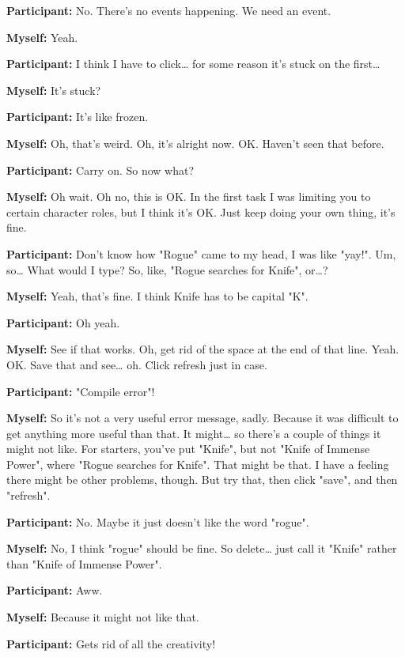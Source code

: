 \documentclass[11pt]{report}
\newcommand{\llabel}[1]{\hypertarget{llineno:#1}{\linelabel{#1}}}
\begin{document}
\begin{linenumbers}
\textbf{Participant:} No. There's no events happening. We need an event.

\textbf{Myself:} Yeah.

\textbf{Participant:} I think I have to click\ldots{} for some reason it's stuck on the first\ldots{}

\textbf{Myself:} It's stuck?

\textbf{Participant:} It's like frozen.

\textbf{Myself:} Oh, that's weird. Oh, it's alright now. OK. Haven't seen that before.

\textbf{Participant:} Carry on. So now what?

\textbf{Myself:} Oh wait. Oh no, this is OK. In the first task I was limiting you to certain character roles, but I think it's OK. Just keep doing your own thing, it's fine.

\textbf{Participant:} Don't know how "Rogue" came to my head, I was like "yay!". Um, so\ldots{} What would I type? So, like, "Rogue searches for Knife", or\ldots{}?

\textbf{Myself:} Yeah, that's fine. I think Knife has to be capital "K".\llabel{lne:syntax5c}

\textbf{Participant:} Oh yeah.

\textbf{Myself:} See if that works. Oh, get rid of the space at the end of that line. Yeah. OK. Save that and see\ldots{} oh. Click refresh just in case.

\textbf{Participant:} "Compile error"!

\textbf{Myself:} So it's not a very useful error message, sadly. Because it was difficult to get anything more useful than that. It might\ldots{} so there's a couple of things it might not like. For starters, you've put "Knife", but not "Knife of Immense Power", where "Rogue searches for Knife". That might be that. I have a feeling there might be other problems, though. But try that, then click "save", and then "refresh".

\textbf{Participant:} No. Maybe it just doesn't like the word "rogue".

\textbf{Myself:} No, I think "rogue" should be fine. So delete\ldots{} just call it "Knife" rather than "Knife of Immense Power".

\textbf{Participant:} Aww.

\textbf{Myself:} Because it might not like that.

\textbf{Participant:} Gets rid of all the creativity!


\end{linenumbers}
\end{document}
